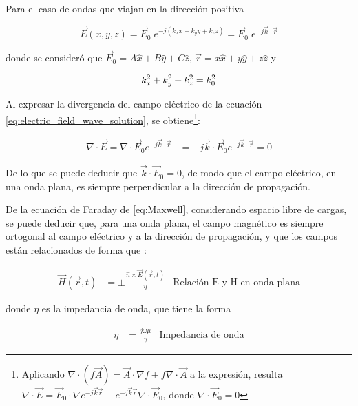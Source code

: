 Para el caso de ondas que viajan en la dirección positiva

\begin{equation}
	\label{eq:electric_field_wave_solution}
	\vec{E}(x,y,z) = \vec{E}_0 \;e^{-j(k_x x + k_y y + k_z z)} = \vec{E}_0 \;e^{-j\vec{k}\cdot\vec{r}}
\end{equation}

donde se consideró que $\vec{E}_0 = A \hat{x} + B \hat{y} + C \hat{z}$, $\vec{r} = x \hat{x} + y \hat{y} + z \hat{z}$ y

\begin{equation}
\label{eq:numero_de_onda}
k_x^2 + k_y^2 + k_z^2 = k_0^2 \\
\end{equation}


Al expresar la divergencia del campo eléctrico de la ecuación \ref{eq:electric_field_wave_solution}, se obtiene\footnote{Aplicando $\nabla \cdot (f \vec{A}) = \vec{A} \cdot \nabla f + f \nabla \cdot \vec{A}$ a la expresión, resulta $\nabla \cdot \vec{E} = \vec{E}_0 \cdot \nabla e^{-j \vec{k} \vec{r}} + e^{-j \vec{k} \vec{r}}\nabla \cdot \vec{E}_0$, donde $\nabla \cdot \vec{E}_0 =0$}:


\begin{align}
\nabla \cdot \vec{E} = \nabla \cdot \vec{E}_0 e^{-j\vec{k} \cdot \vec{r}} & = -j \vec{k} \cdot \vec{E}_0 e^{-j \vec{k} \cdot \vec{r}} = 0
\end{align}

De lo que se puede deducir que $\vec{k} \cdot \vec{E}_0 = 0$, de modo que el campo eléctrico, en una onda plana, es siempre perpendicular a la dirección de propagación.

De la ecuación de Faraday de \ref{eq:Maxwell}, considerando espacio libre de cargas, se puede deducir que, para una onda plana, el campo magnético es siempre ortogonal al campo eléctrico y a la dirección de propagación, y que los campos están relacionados de forma que \cite{Fernandez:Electromag}:

\begin{align}
	\label{eq:relacion-e-h-ondaplana}
	\vec{H}(\vec{r},t) &= \pm \frac{\hat{n} \times \vec{E}(\vec{r},t)}{\eta}  & \text{Relación E y H en onda plana}
\end{align}

donde $\eta$ es la impedancia de onda, que tiene la forma

\begin{align}
	\eta &= \frac{j \omega \mu}{\gamma }& \text{Impedancia de onda}
\end{align}

